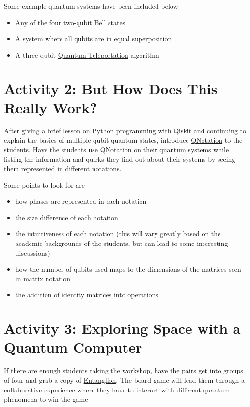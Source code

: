 \documentclass{article}
\begin{document}
Some example quantum systems have been included below
\begin{itemize}
    \item Any of the \href{https://codebook.xanadu.ai/I.14}{four two-qubit Bell states}
    \item A system where all qubits are in equal superposition
    \item A three-qubit \href{https://github.com/qiskit-community/qiskit-community-tutorials/blob/master/Coding_With_Qiskit/ep5_Quantum_Teleportation.ipynb}{Quantum Teleportation} algorithm
\end{itemize}

\section{Activity 2: But How Does This Really Work?}

After giving a brief lesson on Python programming with \href{https://www.ibm.com/quantum/qiskit}{Qiskit} and continuing to explain the basics of multiple-qubit quantum states, introduce \href{https://www.computer.org/csdl/proceedings-article/qce/2023/432302a373/1SuQKBiBjR6}{QNotation} to the students. Have the students use QNotation on their quantum systems while listing the information and quirks they find out about their systems by seeing them represented in different notations.

Some points to look for are 
\begin{itemize}
    \item how phases are represented in each notation
    \item the size difference of each notation
    \item the intuitiveness of each notation (this will vary greatly based on the academic backgrounds of the students, but can lead to some interesting discussions)
    \item how the number of qubits used maps to the dimensions of the matrices seen in matrix notation
    \item the addition of identity matrices into operations
\end{itemize}

\section{Activity 3: Exploring Space with a Quantum Computer
}

If there are enough students taking the workshop, have the pairs get into groups of four and grab a copy of \href{https://entanglion.github.io}{Entanglion}. The board game will lead them through a collaborative experience where they have to interact with different quantum phenomena to win the game
\end{document}
